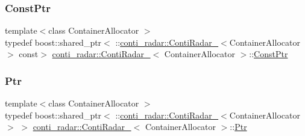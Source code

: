 \mbox{\label{structconti__radar_1_1ContiRadar___a8a2b8322d7f35af8a6756a33748bf85b}} 
\subsubsection{\texorpdfstring{Const\+Ptr}{ConstPtr}}
{\footnotesize\ttfamily template$<$class Container\+Allocator $>$ \\
typedef boost\+::shared\+\_\+ptr$<$ \+::\hyperlink{structconti__radar_1_1ContiRadar__}{conti\+\_\+radar\+::\+Conti\+Radar\+\_\+}$<$Container\+Allocator$>$ const$>$ \hyperlink{structconti__radar_1_1ContiRadar__}{conti\+\_\+radar\+::\+Conti\+Radar\+\_\+}$<$ Container\+Allocator $>$\+::\hyperlink{structconti__radar_1_1ContiRadar___a8a2b8322d7f35af8a6756a33748bf85b}{Const\+Ptr}}

\mbox{\label{structconti__radar_1_1ContiRadar___aa9be4abcc5d49658f43e40444976d22d}} 
\subsubsection{\texorpdfstring{Ptr}{Ptr}}
{\footnotesize\ttfamily template$<$class Container\+Allocator $>$ \\
typedef boost\+::shared\+\_\+ptr$<$ \+::\hyperlink{structconti__radar_1_1ContiRadar__}{conti\+\_\+radar\+::\+Conti\+Radar\+\_\+}$<$Container\+Allocator$>$ $>$ \hyperlink{structconti__radar_1_1ContiRadar__}{conti\+\_\+radar\+::\+Conti\+Radar\+\_\+}$<$ Container\+Allocator $>$\+::\hyperlink{structconti__radar_1_1ContiRadar___aa9be4abcc5d49658f43e40444976d22d}{Ptr}}

\mbox{\label{structconti__radar_1_1ContiRadar___ab750a8aec78c3a090439c7425be8e9fc}} 
